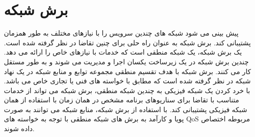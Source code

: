  \section{برش شبکه}
 پیش بینی می شود شبکه های  چندین سرویس را با نیازهای مختلف به طور همزمان پشتیبانی کند.
 برش شبکه
به عنوان راه حلی برای چنین تقاضا در نظر گرفته شده است.
یک برش شبکه، یک شبکه منطقی  است که خدمات  با نیازهای خاص را ارائه می دهد.
 چندین برش شبکه
در یک زیرساخت یکسان
  اجرا و مدیریت می شوند و
به طور مستقل کار می کنند.
برش شبکه
 با هدف تقسیم منطقی مجموعه توابع و منابع شبکه در یک نهاد شبکه در نظر گرفته شده است که مطابق با خواسته های فنی یا تجاری خاص می باشد.
 با خرد کردن یک شبکه فیزیکی به چندین شبکه منطقی، برش شبکه می تواند از خدمات متناسب با تقاضا برای سناریوهای برنامه مشخص در همان زمان با استفاده از همان شبکه فیزیکی پشتیبانی کند.
با استفاده از برش شبکه، منابع شبکه می توانند به صورت پویا و کارآمد به برش های شبکه منطقی با توجه به خواسته های QoS مربوطه اختصاص داده شوند\cite{NS1}. 

